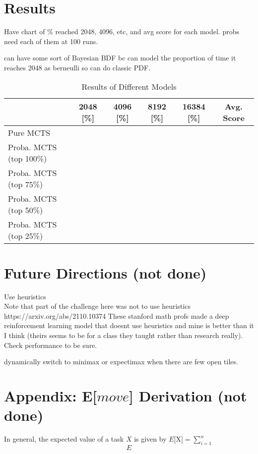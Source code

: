 \documentclass{article}
\begin{document}
\section{Results}
Have chart of \% reached 2048, 4096, etc, and avg score for each model. probs need each of them at 100 runs.

can have some sort of Bayesian BDF bc can model the proportion of time it reaches 2048 as berneulli so can do classic PDF.\\



\begin{table}[H]
  \caption{Results of Different Models}
  \begin{tabular}{|l|c|c|c|c|c|}
    \hline
    & 2048 [\%] & 4096 [\%] & 8192 [\%] & 16384 [\%] & Avg. Score \\
    \hline
    Pure MCTS & & & & & \\
    \hline
    Proba. MCTS (top 100\%) & & & & & \\
    \hline
    Proba. MCTS (top 75\%) & & & & & \\
    \hline
    Proba. MCTS (top 50\%) & & & & & \\
    \hline
    Proba. MCTS (top 25\%) & & & & & \\
    \hline
  \end{tabular}
\end{table}

\section{Future Directions (not done)}
Use heuristics\\
Note that part of the challenge here was not to use heuristics
https://arxiv.org/abs/2110.10374
These stanford math profs made a deep reinforcement learning model that doesnt use heuristics and mine is better than it I think (theirs seems to be for a class they taught rather than research really). Check performance to be sure.

dynamically switch to minimax or expectimax when there are few open tiles.

\appendix
\section*{Appendix: E[$move$] Derivation (not done)}
In general, the expected value of a task $X$ is given by $E[$X$] = \sum_{i=1}^n$
$$ E $$
\end{document}

